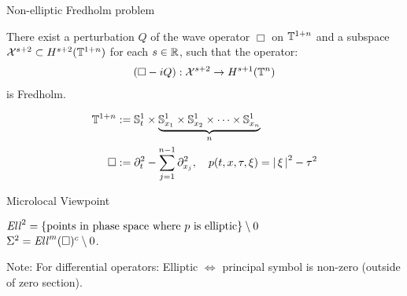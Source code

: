 \documentclass{beamer}
\begin{document}
\begin{frame}{Non-elliptic Fredholm problem}
\begin{theorem} 
    There exist a perturbation $Q$ of the wave operator $\Box$ on ${\mathbb T}^{1 + n}$ and a subspace $\mathcal{X}^{s + 2} \subset H^{s+ 2}({\mathbb T}^{1 +n})$ for each $s \in {\ensuremath {\mathbb R}}$, such that the operator: 
    \begin{align*}
    (\Box - iQ): \mathcal{X}^{s + 2} \to H^{s + 1}({\mathbb T}^n)
    \end{align*}
    is Fredholm. 
\end{theorem}
\begin{align*}
{\ensuremath {\mathbb T}}^{1 + n} &:= \mathbb S^1_t \times  \underbrace{\mathbb S^1_{x_1} \times \mathbb S^1_{x_2} \times \dots \times \mathbb S^1_{x_n}}_{n} \\
\Box &:= \partial_t^2 - \sum_{j = 1}^{n -1} \partial_{x_j}^2, \quad p(t, x, \tau, \xi) = \left|\, \xi\,\right|^2 - \tau^2
\end{align*}
\end{frame} 

\begin{frame}{Microlocal Viewpoint}
\begin{center}
\end{center}
$\mathit{Ell}^2=  \left\{\text{points in phase space where $p$ is elliptic}\right\} \setminus 0 $ \\
$\Sigma^2 = \mathit{Ell}^m(\Box)^c \setminus 0$. 

Note: For differential operators: Elliptic $\iff$  principal symbol is non-zero (outside of zero section). 
\end{frame} 
\end{document}
